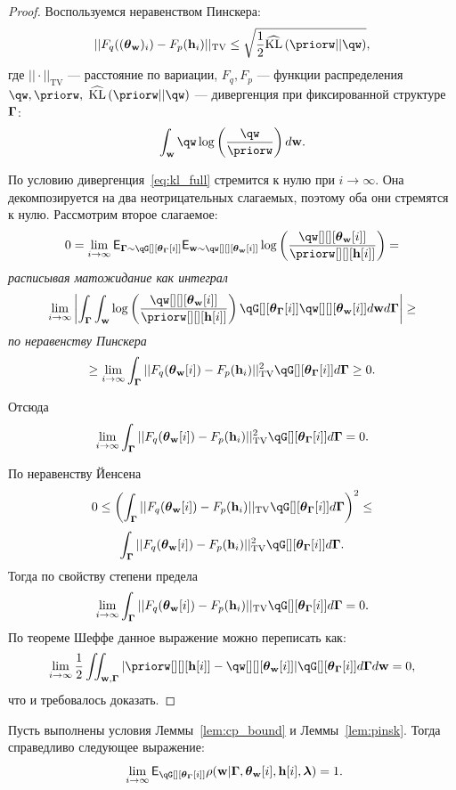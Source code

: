 \begin{proof}
Воспользуемся неравенством Пинскера:
\[
    ||F_q((\tetaw)_i)-F_p(\h_i)||_\text{TV}\leq\sqrt{\frac{1}{2}\widehat{\text{KL}}\left(\priorw||\qw\right)},
\]
где $||\cdot||_\text{TV}$ --- расстояние по вариации, $F_q, F_p$ --- функции распределения  $\qw,\priorw,$  $\widehat{\text{KL}}\left(\priorw||\qw\right)$ --- дивергенция при фиксированной структуре $\boldsymbol{\Gamma}$:
\[
   \int_{\w} \qw \log \left(\frac{\qw}{\priorw}\right) d\w.
\]

По условию дивергенция~\eqref{eq:kl_full} стремится к нулю при $i \to \infty$. Она декомпозируется на два  неотрицательных слагаемых, поэтому оба они стремятся к нулю.
Рассмотрим второе слагаемое:
\[
  0 =   \lim_{i \to \infty} \E_{\G \sim \qG[][{\tetaG[i]}]} \E_{\w \sim \qw[][][{\tetaw[i]}]} \log \left(\frac{\qw[][][{\tetaw[i]}]}{\priorw[][][{\h[i]}]}\right) = 
\]
\textit{расписывая матожидание как интеграл}
\[
 \lim_{i \to \infty} \left|\int_{\G} \int_{\w} \log \left(\frac{\qw[][][{\tetaw[i]}]}{\priorw[][][{\h[i]}]}\right)\qG[][{\tetaG[i]}]\qw[][][{\tetaw[i]}] d\w d\G \right| \geq  
\]
\textit{по неравенству Пинскера}
\[
\geq \lim_{i \to \infty}  \int_{\G} ||F_q({\tetaw[i]})-F_p(\h_i)||^2_\text{TV}\qG[][{\tetaG[i]}] d\G \geq 0.  
\]

Отсюда
\[
\lim_{i \to \infty}  \int_{\G} ||F_q({\tetaw[i]})-F_p(\h_i)||^2_\text{TV}\qG[][{\tetaG[i]}] d\G = 0.
\]

По неравенству Йенсена 
\[
0 \leq  \left(\int_{\G} ||F_q({\tetaw[i]})-F_p(\h_i)||_\text{TV}\qG[][{\tetaG[i]}] d\G\right)^2 \leq
\]
\[
    \int_{\G} ||F_q({\tetaw[i]})-F_p(\h_i)||^2_\text{TV}\qG[][{\tetaG[i]}] d\G.
\]
Тогда по свойству степени предела $$\lim_{i \to \infty} \int_{\G}||F_q({\tetaw[i]})-F_p(\h_i)||_\text{TV} \qG[][{\tetaG[i]}] d\G = 0.$$
По теореме Шеффе данное выражение можно переписать как:
\begin{equation}
\label{eq:sheffe}
    \lim_{i \to \infty}   \frac{1}{2}\iint_{\w,\G} |\priorw[][][{\h[i]}] - \qw[][][{\tetaw[i]}]| \qG[][{\tetaG[i]}] d\G d\w = 0,
\end{equation}
что и требовалось доказать.
\end{proof}




\begin{theorem}
Пусть выполнены условия Леммы~\ref{lem:cp_bound} и  Леммы~\ref{lem:pinsk}.
Тогда справедливо следующее выражение:
\[
   \lim_{i \to \infty} \E_{\qG[][{\tetaG[i]}]} {\rho}(\w|\G, {\tetaw[i]}, {\h[i]}, \lam) = 1.
\]

\end{theorem}


